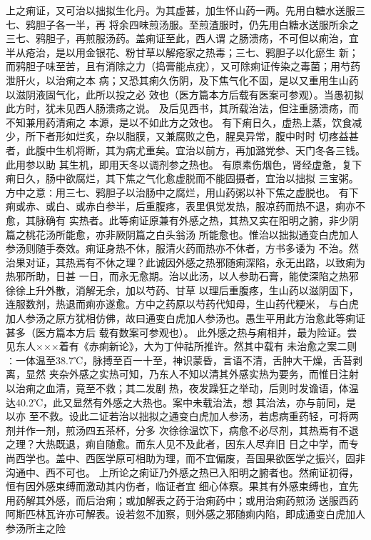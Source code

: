 \documentclass[a4paper,12pt,UTF8,twoside]{ctexbook}
\begin{document}
上之痢证，又可治以拙拟生化丹。为其虚甚，加生怀山药一两。先用白糖水送服三七、鸦胆子各一半，再 
将余四味煎汤服。至煎渣服时，仍先用白糖水送服所余之三七、鸦胆子，再煎服汤药。盖痢证至此，西人谓 
之肠溃疡，不可但以痢治，宜半从疮治，是以用金银花、粉甘草以解疮家之热毒；三七、鸦胆子以化瘀生 
新；而鸦胆子味至苦，且有消除之力（捣膏能点疣），又可除痢证传染之毒菌；用芍药泄肝火，以治痢之本 
病；又恐其痢久伤阴，及下焦气化不固，是以又重用生山药以滋阴液固气化，此所以投之必 
效也（医方篇本方后载有医案可参观）。当愚初拟此方时，犹未见西人肠溃疡之说。 
及后见西书，其所载治法，但注重肠溃疡，而不知兼用药清痢之 
本源，是以不如此方之效也。 
有下痢日久，虚热上蒸，饮食减少，所下者形如烂炙，杂以脂膜，又兼腐败之色，腥臭异常，腹中时时 
切疼益甚者，此腹中生机将断，其为病尤重矣。宜治以前方，再加潞党参、天门冬各三钱。此用参以助 
其生机，即用天冬以调剂参之热也。 
有原素伤烟色，肾经虚惫，复下痢日久，肠中欲腐烂，其下焦之气化愈虚脱而不能固摄者，宜治以拙拟 
三宝粥。方中之意∶用三七、鸦胆子以治肠中之腐烂，用山药粥以补下焦之虚脱也。 
有下痢或赤、或白、或赤白参半，后重腹疼，表里俱觉发热，服凉药而热不退，痢亦不愈，其脉确有 
实热者。此等痢证原兼有外感之热，其热又实在阳明之腑，非少阴篇之桃花汤所能愈，亦非厥阴篇之白头翁汤 
所能愈也。惟治以拙拟通变白虎加人参汤则随手奏效。痢证身热不休，服清火药而热亦不休者，方书多诿为 
不治。然治果对证，其热焉有不休之理？此诚因外感之热邪随痢深陷，永无出路，以致痢为热邪所助，日甚 
一日，而永无愈期。治以此汤，以人参助石膏，能使深陷之热邪徐徐上升外散，消解无余，加以芍药、甘草 
以理后重腹疼，生山药以滋阴固下，连服数剂，热退而痢亦遂愈。方中之药原以芍药代知母，生山药代粳米， 
与白虎加人参汤之原方犹相仿佛，故曰通变白虎加人参汤也。愚生平用此方治愈此等痢证甚多（医方篇本方后 
载有数案可参观也）。 
此外感之热与痢相并，最为险证。尝见东人×××着有《赤痢新论》，大为丁仲祜所推许。然其中载有 
未治愈之案二则∶一体温至38.7℃，脉搏至百一十至，神识蒙昏，言语不清，舌肿大干燥，舌苔剥离，显然 
夹杂外感之实热可知，乃东人不知以清其外感实热为要务，而惟日注射以治痢之血清，竟至不救；其二发剧 
热，夜发躁狂之举动，后则时发谵语，体温达40.2℃，此又显然有外感之大热也。案中未载治法，想 
其治法，亦与前同，是以亦 
至不救。设此二证若治以拙拟之通变白虎加人参汤，若虑病重药轻，可将两剂并作一剂，煎汤四五茶杯，分多 
次徐徐温饮下，病愈不必尽剂，其热焉有不退之理？大热既退，痢自随愈。而东人见不及此者，因东人尽弃旧 
日之中学，而专尚西学也。盖中、西医学原可相助为理，而不宜偏废，吾国果欲医学之振兴，固非 
沟通中、西不可也。 
上所论之痢证乃外感之热已入阳明之腑者也。然痢证初得，恒有因外感束缚而激动其内伤者，临证者宜 
细心体察。果其有外感束缚也，宜先用药解其外感，而后治痢；或加解表之药于治痢药中；或用治痢药煎汤 
送服西药阿斯匹林瓦许亦可解表。设若忽不加察，则外感之邪随痢内陷，即成通变白虎加人参汤所主之险 
\end{document}
